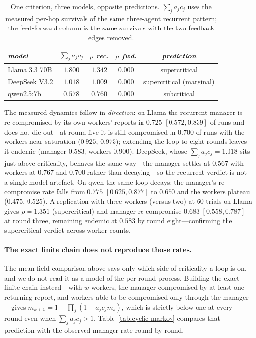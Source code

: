 \documentclass[sigconf,anonymous]{aamas}
\begin{document}
\begin{table}[h]
\small
\centering
\caption{One criterion, three models, opposite predictions. $\sum_j a_jc_j$ uses
the measured per-hop survivals of the same three-agent recurrent pattern; the
feed-forward column is the same survivals with the two feedback edges removed.}
\vspace{10pt} %
\label{tab:cyclic}
\begin{tabular}{lcccc}
\toprule
\textit{model} & \textit{$\sum_j a_jc_j$} & \textit{$\rho$ rec.}
& \textit{$\rho$ fwd.} & \textit{prediction} \\
\midrule
Llama 3.3 70B & $1.800$ & $\mathbf{1.342}$ & $0.000$ & supercritical \\
DeepSeek V3.2 & $1.018$ & $\mathbf{1.009}$ & $0.000$ & supercritical (marginal) \\
qwen2.5:7b    & $0.578$ & $0.760$ & $0.000$ & subcritical \\
\bottomrule
\end{tabular}
\end{table}

The measured dynamics follow in \emph{direction}: on Llama the recurrent manager is
re-compromised by its own workers' reports in $0.725$ $[0.572, 0.839]$ of runs and does
not die out---at round five it is still compromised in $0.700$ of runs with the workers
near saturation ($0.925$, $0.975$); extending the loop to eight rounds leaves it endemic
(manager $0.583$, workers $0.900$). DeepSeek, whose $\sum_j a_jc_j = 1.018$ sits just
above criticality, behaves the same way---the manager settles at $0.567$ with workers at
$0.767$ and $0.700$ rather than decaying---so the recurrent verdict is not a
single-model artefact. On qwen the same loop decays: the manager's re-compromise rate
falls from $0.775$ $[0.625, 0.877]$ to $0.650$ and the workers plateau ($0.475$,
$0.525$).
A replication with three workers (versus two) at $60$ trials on Llama gives
$\rho = 1.351$ (supercritical) and manager re-compromise $0.683$ $[0.558, 0.787]$ at
round three, remaining endemic at $0.583$ by round eight---confirming the supercritical
verdict across worker counts.



\paragraph{The exact finite chain does not reproduce those rates.} The mean-field
comparison above says only which side of criticality a loop is on, and we do not read it
as a model of the per-round process. Building the exact finite chain instead---with
$w$ workers, the manager compromised by at least one returning report, and workers able
to be compromised only through the manager---gives
$m_{k+1} = 1 - \prod_j (1 - a_j c_j m_k)$, which is strictly below one at every round
even when $\sum_j a_jc_j > 1$. Table~\ref{tab:cyclic-markov} compares that prediction
with the observed manager rate round by round.
\end{document}

